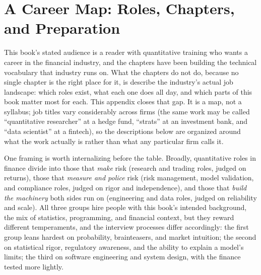 \documentclass[../ai_in_finance]{subfiles}
\begin{document}
\ifSubfilesClassLoaded{\appendix}{}
\chapter{A Career Map: Roles, Chapters, and Preparation}
\label{app:careers}

This book's stated audience is a reader with quantitative training who wants a career in the financial industry, and the chapters have been building the technical vocabulary that industry runs on. What the chapters do not do, because no single chapter is the right place for it, is describe the industry's actual job landscape: which roles exist, what each one does all day, and which parts of this book matter most for each. This appendix closes that gap. It is a map, not a syllabus; job titles vary considerably across firms (the same work may be called ``quantitative researcher'' at a hedge fund, ``strats'' at an investment bank, and ``data scientist'' at a fintech), so the descriptions below are organized around what the work actually is rather than what any particular firm calls it.

One framing is worth internalizing before the table. Broadly, quantitative roles in finance divide into those that \emph{make} risk (research and trading roles, judged on returns), those that \emph{measure and police} risk (risk management, model validation, and compliance roles, judged on rigor and independence), and those that \emph{build the machinery} both sides run on (engineering and data roles, judged on reliability and scale). All three groups hire people with this book's intended background, the mix of statistics, programming, and financial context, but they reward different temperaments, and the interview processes differ accordingly: the first group leans hardest on probability, brainteasers, and market intuition; the second on statistical rigor, regulatory awareness, and the ability to explain a model's limits; the third on software engineering and system design, with the finance tested more lightly.
\end{document}
